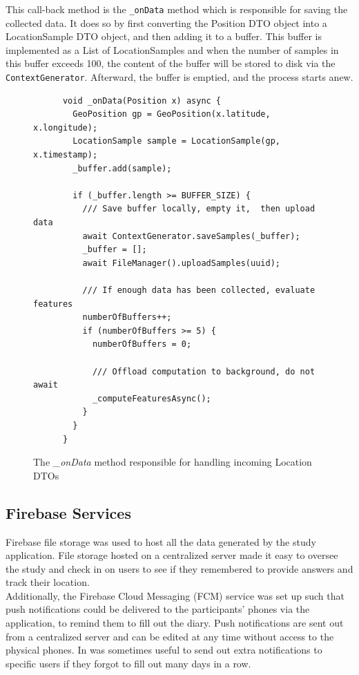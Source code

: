 This call-back method is the \verb|_onData| method which is responsible for saving the collected data. It does so by first converting the Position DTO object into a LocationSample DTO object, and then adding it to a buffer. This buffer is implemented as a List of LocationSamples and when the number of samples in this buffer exceeds 100, the content of the buffer will be stored to disk via the \verb|ContextGenerator|. Afterward, the buffer is emptied, and the process starts anew. 

\begin{figure}[h]
    \centering
    \begin{verbatim}
      void _onData(Position x) async {
        GeoPosition gp = GeoPosition(x.latitude, x.longitude);
        LocationSample sample = LocationSample(gp, x.timestamp);
        _buffer.add(sample);

        if (_buffer.length >= BUFFER_SIZE) {
          /// Save buffer locally, empty it,  then upload data
          await ContextGenerator.saveSamples(_buffer);
          _buffer = [];
          await FileManager().uploadSamples(uuid);
    
          /// If enough data has been collected, evaluate features
          numberOfBuffers++;
          if (numberOfBuffers >= 5) {
            numberOfBuffers = 0;
    
            /// Offload computation to background, do not await
            _computeFeaturesAsync();
          }
        }
      }
    \end{verbatim}
    \caption{The \textit{\_onData} method responsible for handling incoming Location DTOs}
    \label{fig:ondata-method}
\end{figure}


\subsection{Firebase Services}
Firebase file storage was used to host all the data generated by the study application. File storage hosted on a centralized server made it easy to oversee the study and check in on users to see if they remembered to provide answers and track their location. \\

Additionally, the Firebase Cloud Messaging (FCM) service was set up such that push notifications could be delivered to the participants' phones via the application, to remind them to fill out the diary. Push notifications are sent out from a centralized server and can be edited at any time without access to the physical phones. In was sometimes useful to send out extra notifications to specific users if they forgot to fill out many days in a row.

